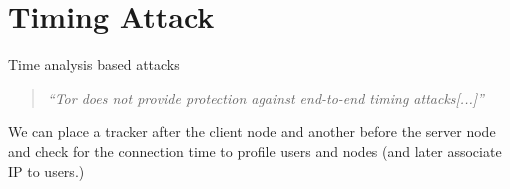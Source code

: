 
\section{Timing Attack}
\begin{frame}{Time analysis based attacks}{}
	\begin{quote}
		\emph{``Tor does not provide protection against end-to-end timing attacks[...]''}
	\end{quote}
	We can place a tracker after the client node and another before the server node
	and check for the connection time to profile users and nodes (and later associate IP to users.)
\end{frame}


